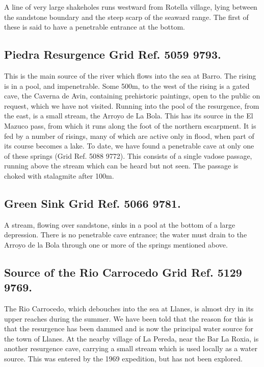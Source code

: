 \documentclass[11pt, a4paper, twoside]{memoir}
\begin{document}
A line of very large shakeholes runs westward from Rotella village, lying between the sandstone boundary and the steep scarp of the seaward range. The first of these is said to have a penetrable entrance at the bottom.

\subsection*{Piedra Resurgence Grid Ref. 5059 9793.}

This is the main source of the river which flows into the sea at Barro. The rising is in a pool, and impenetrable. Some 500m, to the west of the rising is a gated cave, the Caverna de Avin, containing prehistoric paintings, open to the public on request, which we have not visited. Running into the pool of the resurgence, from the east, is a small stream, the Arroyo de La Bola. This has its source in the El Mazuco pass, from which it runs along the foot of the northern escarpment. It is fed by a number of risings, many of which are active only in flood, when part of its course becomes a lake. To date, we have found a penetrable cave at only one of these springs (Grid Ref. 5088 9772). This consists of a single vadose passage, running above the stream which can be heard but not seen. The passage is choked with stalagmite after 100m.

\subsection*{Green Sink Grid Ref. 5066 9781.}

A stream, flowing over sandstone, sinks in a pool at the bottom of a large depression. There is no penetrable cave entrance; the water must drain to the Arroyo de la Bola through one or more of the springs mentioned above.


\subsection*{Source of the Rio Carrocedo Grid Ref. 5129 9769.}

The Rio Carrocedo, which debouches into the sea at Llanes, is almost dry in its upper reaches during the summer. We have been told that the reason for this is that the resurgence has been dammed and is now the principal water source for the town of Llanes. At the nearby village of La Pereda, near the Bar La Roxia, is another resurgence cave, carrying a small stream which is used locally as a water source. This was entered by the 1969 expedition, but has not been explored.
\end{document}
